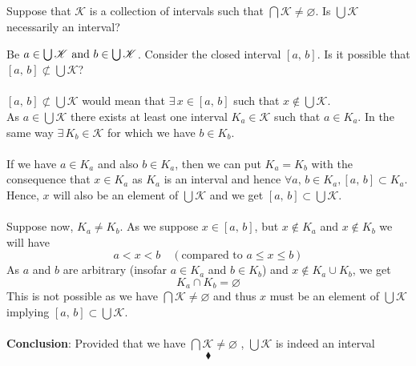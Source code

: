 \subsection{}
\begin{tcolorbox}
Suppose that $\mathscr{K}$ is a collection of intervals such that $\bigcap\mathscr{K}\neq \varnothing$. Is $\bigcup\mathscr{K}$ necessarily an interval?
\end{tcolorbox}
Be $a\in \bigcup \mathscr{K}\text{ and } b\in \bigcup \mathscr{K}$. Consider the closed interval $[a,\, b]$. Is it possible that $[a,\, b]\not \subset \bigcup \mathscr{K}$?\\\\
$[a,\, b]\not \subset \bigcup \mathscr{K}$ would mean that $\exists\, x\in [a,\, b]$ such that $x\not\in \bigcup \mathscr{K}$.\\
As $a\in \bigcup \mathscr{K}$ there exists at least one interval $K_a\in \mathscr{K}$ such that $a\in K_a$. In the same way $\exists\, K_b\in\mathscr{K}$ for which we have $b\in K_b$.\\\\
If we have $a\in K_a$ and also $b\in K_a$, then we can put $K_a=K_b$ with the consequence that  $x\in K_a$ as $K_a$ is an interval and hence $\forall a,\, b\in K_a, [a,\, b]\subset K_a$.\\
Hence, $x$ will also be an element of $\bigcup \mathscr{K}$ and we get $[a,\, b]\subset \bigcup \mathscr{K}$.\\\\
Suppose now, $K_a\neq K_b$. As we suppose $x\in [a,\, b]$, but $x\not\in K_a$ and $x\not\in K_b$ we will have 
$$a<x<b\quad(\text{compared to } a\leq x\leq b)$$
As $a$ and $b$ are arbitrary (insofar $a\in K_a$ and $b\in K_b$) and $x\not \in K_a\cup K_b$, we get $$K_a\cap K_b=\varnothing$$
This is not possible as we have $\bigcap\mathscr{K}\neq \varnothing$ and thus $x$ must be an element of $\bigcup \mathscr{K}$ implying $[a,\, b]\subset \bigcup \mathscr{K}$.\\\\
\textbf{Conclusion}: Provided that we have $\bigcap\mathscr{K}\neq \varnothing$ , $\bigcup \mathscr{K}$ is indeed an interval 
$$\blacklozenge$$
\newpage


\renewcommand{\thesubsection}{\thesection.\arabic{subsection}}
\setcounter{subsection}{0}

